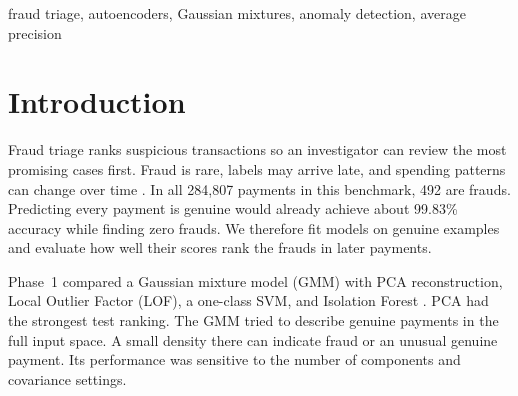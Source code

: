 \begin{abstract}
We evaluated two autoencoders and three hybrid anomaly detectors for credit-card fraud triage on the same time-ordered ULB data as Phase~1. The models fit genuine training payments. Validation chooses settings and alert thresholds, and the final evaluation uses 56,962 test payments containing 75 frauds. PCA reconstruction remains the strongest model by average precision (AP, 0.7425). The denoising autoencoder reaches 0.4818 AP and improves on the stored Gaussian mixture model (0.2679 AP) by 0.2139, with a paired 95\% bootstrap interval of [0.1177, 0.3124]. Combining the two scores selects zero weight for the mixture. DAGMM-lite, which adds reconstruction errors to a compressed representation, reaches 0.4541 AP. At a threshold fixed using the 0.5\% validation false-positive target, it catches 59 of 75 test frauds and raises 197 false alarms. The results distinguish how well a model ranks fraud from how many reviews an alert policy creates.
\end{abstract}

\begin{IEEEkeywords}
fraud triage, autoencoders, Gaussian mixtures, anomaly detection, average precision
\end{IEEEkeywords}

\section{Introduction}
Fraud triage ranks suspicious transactions so an investigator can review the most promising cases first. Fraud is rare, labels may arrive late, and spending patterns can change over time \cite{dalpozzolo2018credit,carcillo2018scarff}. In all 284,807 payments in this benchmark, 492 are frauds. Predicting every payment is genuine would already achieve about 99.83\% accuracy while finding zero frauds. We therefore fit models on genuine examples and evaluate how well their scores rank the frauds in later payments.

Phase~1 compared a Gaussian mixture model (GMM) with PCA reconstruction, Local Outlier Factor (LOF), a one-class SVM, and Isolation Forest \cite{shyu2003novel,breunig2000lof,scholkopf2001estimating,liu2008isolation}. PCA had the strongest test ranking. The GMM tried to describe genuine payments in the full input space. A small density there can indicate fraud or an unusual genuine payment. Its performance was sensitive to the number of components and covariance settings.

